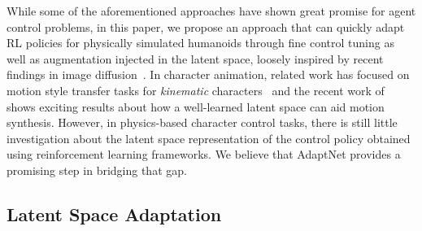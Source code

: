 While some of the aforementioned approaches have shown great promise for agent control problems, 
in this paper, we propose an approach that can quickly adapt RL policies for physically simulated humanoids through fine control tuning as well as augmentation injected in the latent space, loosely inspired by recent findings in image diffusion~\cite{zhang2023adding,hu2021lora,mou2023t2iadapter}.
In character animation, 
related work has focused on motion style transfer tasks for \emph{kinematic} characters~\cite{mason2017,aberman2020} %
and the recent work of~\citet{starke2022deepphase} shows exciting results about how a well-learned latent space can aid motion synthesis. %
However, in physics-based character control tasks,
there is still little investigation about the latent space representation of the control policy obtained  using reinforcement learning frameworks. We believe that AdaptNet provides a promising step in bridging that gap.




\subsection{Latent Space Adaptation}



